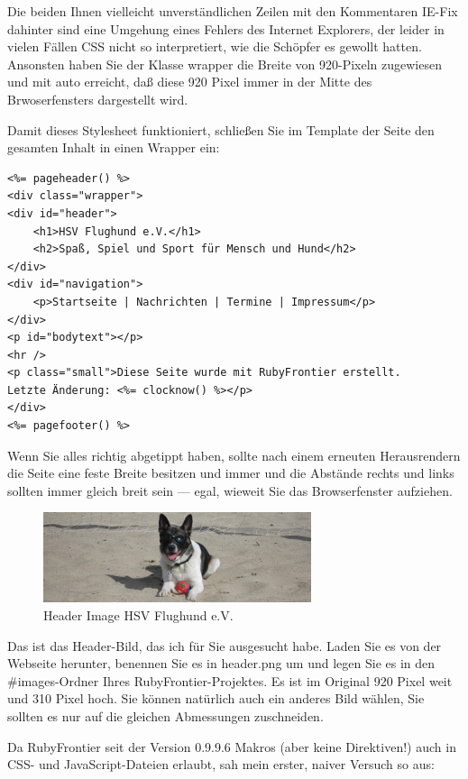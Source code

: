 \documentclass[11pt]{report}
\begin{document}
Die beiden Ihnen vielleicht unverständlichen Zeilen mit den
Kommentaren IE-Fix dahinter sind eine Umgehung eines Fehlers des
Internet Explorers, der leider in vielen Fällen CSS nicht so
interpretiert, wie die Schöpfer es gewollt hatten. Ansonsten haben Sie
der Klasse wrapper die Breite von 920-Pixeln zugewiesen und mit auto
erreicht, daß diese 920 Pixel immer in der Mitte des Brwoserfensters
dargestellt wird.


Damit dieses Stylesheet funktioniert, schließen Sie im Template der
Seite den gesamten Inhalt in einen Wrapper ein:


\begin{verbatim}
<%= pageheader() %>
<div class="wrapper">
<div id="header">
    <h1>HSV Flughund e.V.</h1>
    <h2>Spaß, Spiel und Sport für Mensch und Hund</h2>
</div>
<div id="navigation">
    <p>Startseite | Nachrichten | Termine | Impressum</p>
</div>
<p id="bodytext"></p>
<hr />
<p class="small">Diese Seite wurde mit RubyFrontier erstellt.
Letzte Änderung: <%= clocknow() %></p>
</div>
<%= pagefooter() %>
\end{verbatim}

Wenn Sie alles richtig abgetippt haben, sollte nach einem erneuten
Herausrendern die Seite eine feste Breite besitzen und immer und die
Abstände rechts und links sollten immer gleich breit sein — egal,
wieweit Sie das Browserfenster aufziehen.

\begin{figure}[h!]
\centering
\includegraphics[width=0.7\textwidth]{./images/flughund-header.jpg}
\caption{\label{flughund-header}Header Image HSV Flughund e.V.}
\end{figure}


Das ist das Header-Bild, das ich für Sie ausgesucht habe. Laden Sie es
von der Webseite herunter, benennen Sie es in header.png um und legen
Sie es in den \#images-Ordner Ihres RubyFrontier-Projektes. Es ist im
Original 920 Pixel weit und 310 Pixel hoch. Sie können natürlich auch
ein anderes Bild wählen, Sie sollten es nur auf die gleichen
Abmessungen zuschneiden.


Da RubyFrontier seit der Version 0.9.9.6 Makros (aber keine
Direktiven!) auch in CSS- und JavaScript-Dateien erlaubt, sah mein
erster, naiver Versuch so aus:
\end{document}
